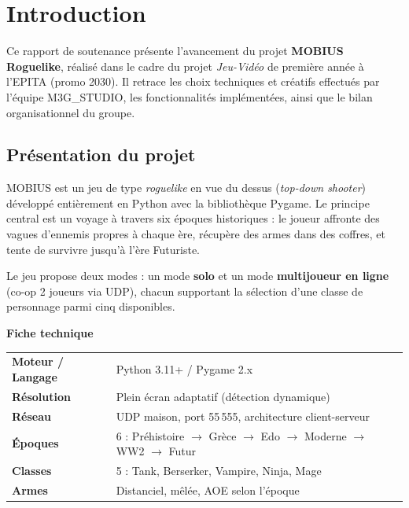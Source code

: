 \documentclass[12pt,a4paper]{article}
\begin{document}
\tableofcontents
\newpage

\section{Introduction}

Ce rapport de soutenance présente l'avancement du projet \textbf{MOBIUS Roguelike}, réalisé dans le cadre du projet \textit{Jeu-Vidéo} de première année à l'EPITA (promo 2030). Il retrace les choix techniques et créatifs effectués par l'équipe M3G\_STUDIO, les fonctionnalités implémentées, ainsi que le bilan organisationnel du groupe.

\subsection{Présentation du projet}

MOBIUS est un jeu de type \textit{roguelike} en vue du dessus (\textit{top-down shooter}) développé entièrement en Python avec la bibliothèque Pygame. Le principe central est un voyage à travers six époques historiques : le joueur affronte des vagues d'ennemis propres à chaque ère, récupère des armes dans des coffres, et tente de survivre jusqu'à l'ère Futuriste.

Le jeu propose deux modes : un mode \textbf{solo} et un mode \textbf{multijoueur en ligne} (co-op 2 joueurs via UDP), chacun supportant la sélection d'une classe de personnage parmi cinq disponibles.

\begin{infobox}
\textbf{Fiche technique}\\[6pt]
\begin{tabular}{@{}ll@{}}
  \textbf{Moteur / Langage} & Python 3.11+ / Pygame 2.x \\[2pt]
  \textbf{Résolution}       & Plein écran adaptatif (détection dynamique) \\[2pt]
  \textbf{Réseau}           & UDP maison, port 55\,555, architecture client-serveur \\[2pt]
  \textbf{Époques}          & 6 : Préhistoire $\to$ Grèce $\to$ Edo $\to$ Moderne $\to$ WW2 $\to$ Futur \\[2pt]
  \textbf{Classes}          & 5 : Tank, Berserker, Vampire, Ninja, Mage \\[2pt]
  \textbf{Armes}            & Distanciel, mêlée, AOE selon l'époque \\
\end{tabular}
\end{infobox}
\end{document}
